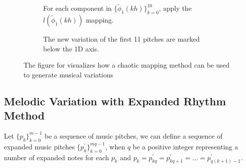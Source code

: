 \documentclass[11pt]{article}
\theoremstyle{definition}
\begin{document}
\begin{figure}
\begin{subfigure}{\textwidth}
  \caption{For each component in $\{\tilde{\phi}_1(kh)\}_{k=0}^{10}$, apply the $l(\tilde{\phi}_1(kh))$ mapping.}
  \label{subfig:traj2nmp}

\end{subfigure}

\vspace{5pt}

\begin{subfigure}{\textwidth}
  \centering
  \caption{The new variation of the first 11 pitches are marked below the 1D axis.}
  \label{subfig:nmp}

\end{subfigure}

\caption{The figure for visualizes how a chaotic mapping method can be used to generate musical variations}
\label{fig:dabby method}
\end{figure}

\subsection{Melodic Variation with Expanded Rhythm Method} 
\label{subsec: melodicvariationwithexpandedrhythm}
Let $\{p_k\}_{k=0}^{m-1}$ be a sequence of music pitches, we can define a sequence of expanded music pitches $\{p^\prime_k\}_{k=0}^{mq-1}$, when $q$ be a positive integer representing a number of expanded notes for each $p_k$ and $p_k = p^\prime_{kq} = p^\prime_{kq + 1} = \dots = p^\prime_{q(k + 1) - 1}$.
\end{document}
